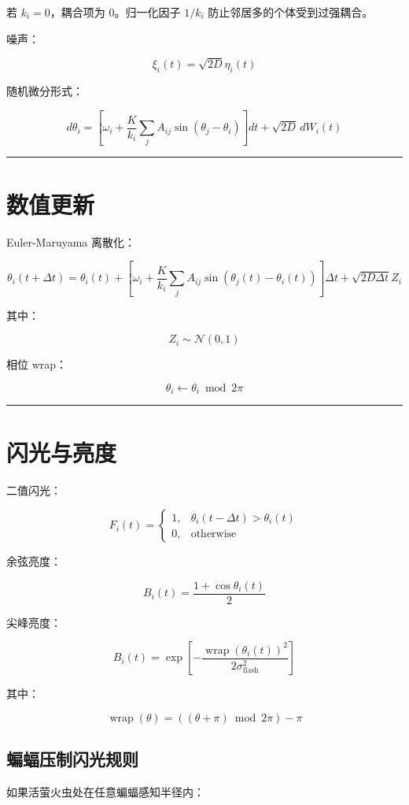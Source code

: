 \documentclass[UTF8]{ctexart}
\begin{document}
若 $k_i=0$，耦合项为 $0$。归一化因子 $1/k_i$ 防止邻居多的个体受到过强耦合。

噪声：

\[
\xi_i(t)=\sqrt{2D}\eta_i(t)
\]

随机微分形式：

\[
d\theta_i
=
\left[
\omega_i+
\frac{K}{k_i}
\sum_j A_{ij}\sin(\theta_j-\theta_i)
\right]dt
+
\sqrt{2D}\,dW_i(t)
\]

\bigskip
\hrule
\bigskip

\section{数值更新}

Euler-Maruyama 离散化：

\[
\theta_i(t+\Delta t)
=
\theta_i(t)
+
\left[
\omega_i+
\frac{K}{k_i}
\sum_j A_{ij}\sin(\theta_j(t)-\theta_i(t))
\right]\Delta t
+
\sqrt{2D\Delta t}Z_i
\]

其中：

\[
Z_i\sim\mathcal{N}(0,1)
\]

相位 wrap：

\[
\theta_i\leftarrow \theta_i\bmod 2\pi
\]

\bigskip
\hrule
\bigskip

\section{闪光与亮度}

二值闪光：

\[
F_i(t)=
\begin{cases}
1,&\theta_i(t-\Delta t)>\theta_i(t)\\
0,&\text{otherwise}
\end{cases}
\]

余弦亮度：

\[
B_i(t)=\frac{1+\cos\theta_i(t)}{2}
\]

尖峰亮度：

\[
B_i(t)=
\exp\left[
-\frac{\operatorname{wrap}(\theta_i(t))^2}
{2\sigma_{\text{flash}}^2}
\right]
\]

其中：

\[
\operatorname{wrap}(\theta)=((\theta+\pi)\bmod 2\pi)-\pi
\]

\subsection{蝙蝠压制闪光规则}

如果活萤火虫处在任意蝙蝠感知半径内：
\end{document}
